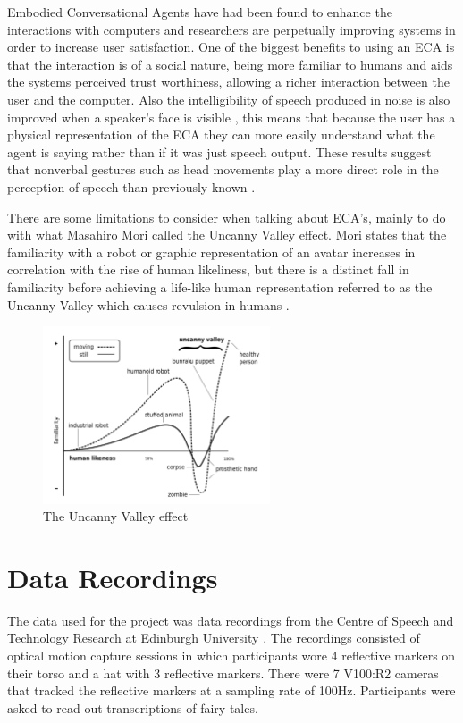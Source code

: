 \documentclass[bsc,frontabs,twoside,singlespacing,parskip,deptreport]{infthesis}
\begin{document}
Embodied Conversational Agents have had been found to enhance the interactions with computers \cite{conv_agents} and researchers are perpetually improving systems in order to increase user satisfaction. One of the biggest benefits to using an ECA is that the interaction is of a social nature, being more familiar to humans and aids the systems perceived trust worthiness, allowing a richer interaction between the user and the computer. Also the intelligibility of speech produced in noise is also improved when a speaker's face is visible \cite{emotion_head_motion}, this means that because the user has a physical representation of the ECA they can more easily understand what the agent is saying rather than if it was just speech output. These results suggest that nonverbal gestures such as head movements play a more direct role in the perception of speech than previously known \cite{vis_prosody}.

There are some limitations to consider when talking about ECA's, mainly to do with what Masahiro Mori called the Uncanny Valley effect. Mori states that the familiarity with a robot or graphic representation of an avatar increases in correlation with the rise of human likeliness, but there is a distinct fall in familiarity before achieving a life-like human representation referred to as the Uncanny Valley which causes revulsion in humans \cite{uncanny}.

\begin{figure}[h!]
	\centering
	\includegraphics[width=0.6\textwidth]{uncanny}
	\caption{The Uncanny Valley effect \cite{image_uncanny}}
\end{figure}

\section{Data Recordings} 

The data used for the project was data recordings from the Centre of Speech and Technology Research at Edinburgh University \cite{cstr_data}. The recordings consisted of optical motion capture sessions in which participants wore 4 reflective markers on their torso and a hat with 3 reflective markers. There were 7 V100:R2 cameras that tracked the reflective markers at a sampling rate of 100Hz. Participants were asked to read out transcriptions of fairy tales.
\end{document}
